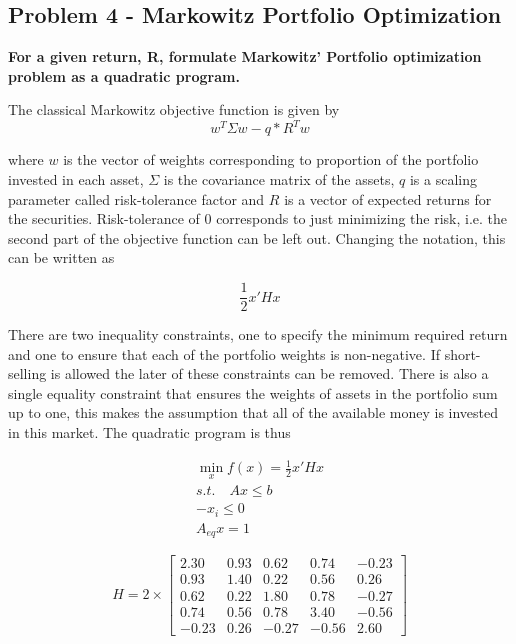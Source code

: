 \newpage
\subsection{Problem 4 - Markowitz Portfolio Optimization}
\textbf{For a given return, R, formulate Markowitz’ Portfolio optimization problem as a quadratic program.}

The classical Markowitz objective function is given by
\begin{equation}
w^{T}\Sigma w-q*R^{T}w
\end{equation}

where $w$ is the vector of weights corresponding to proportion of the portfolio invested in each asset, $\Sigma$ is the covariance matrix of the assets, $q$ is a scaling parameter called risk-tolerance factor and $R$ is a vector of expected returns for the securities. Risk-tolerance of 0 corresponds to just minimizing the risk, i.e. the second part of the objective function can be left out. Changing the notation, this can be written as

\begin{equation}
\frac{1}{2} x'Hx
\end{equation}

There are two inequality constraints, one to specify the minimum required return and one to ensure that each of the portfolio weights is non-negative. If short-selling is allowed the later of these constraints can be removed. There is also a single equality constraint that ensures the weights of assets in the portfolio sum up to one, this makes the assumption that all of the available money is invested in this market. The quadratic program is thus

\begin{equation}
\begin{aligned}
    \min_{x} f(x) = \frac{1}{2} x'Hx \\
    s.t. \quad Ax \leq b \\
    -x_i \leq 0 \\
    A_{eq}x = 1
\end{aligned}
\end{equation}



\[H=2 \times \begin{bmatrix}
 	2.30 & 0.93 & 0.62 & 0.74 & -0.23 \\
   	0.93 & 1.40 & 0.22 & 0.56 & 0.26 \\
    0.62 & 0.22 & 1.80 & 0.78 & -0.27 \\
    0.74 & 0.56 & 0.78 & 3.40 & -0.56 \\
   	-0.23 & 0.26 & -0.27 & -0.56 & 2.60	
\end{bmatrix}
\]

